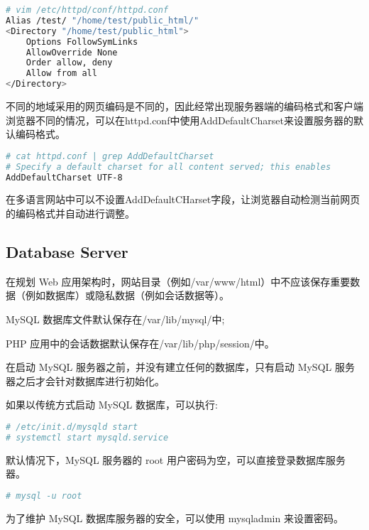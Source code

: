 \begin{lstlisting}[language=bash]
# vim /etc/httpd/conf/httpd.conf
Alias /test/ "/home/test/public_html/"
<Directory "/home/test/public_html">
	Options FollowSymLinks
	AllowOverride None
	Order allow, deny
	Allow from all
</Directory>
\end{lstlisting}


不同的地域采用的网页编码是不同的，因此经常出现服务器端的编码格式和客户端浏览器不同的情况，可以在httpd.conf中使用AddDefaultCharset来设置服务器的默认编码格式。

\begin{lstlisting}[language=bash]
# cat httpd.conf | grep AddDefaultCharset
# Specify a default charset for all content served; this enables
AddDefaultCharset UTF-8
\end{lstlisting}

在多语言网站中可以不设置AddDefaultCHarset字段，让浏览器自动检测当前网页的编码格式并自动进行调整。




\subsection{Database Server}

在规划 Web 应用架构时，网站目录（例如/var/www/html）中不应该保存重要数据（例如数据库）或隐私数据（例如会话数据等）。

\begin{compactitem}
\item MySQL 数据库文件默认保存在/var/lib/mysql/中;
\item PHP 应用中的会话数据默认保存在/var/lib/php/session/中。
\end{compactitem}

在启动 MySQL 服务器之前，并没有建立任何的数据库，只有启动 MySQL 服务器之后才会针对数据库进行初始化。

如果以传统方式启动 MySQL 数据库，可以执行:


\begin{lstlisting}[language=bash]
# /etc/init.d/mysqld start
# systemctl start mysqld.service
\end{lstlisting}


默认情况下，MySQL 服务器的 root 用户密码为空，可以直接登录数据库服务器。

\begin{lstlisting}[language=bash]
# mysql -u root
\end{lstlisting}

为了维护 MySQL 数据库服务器的安全，可以使用 mysqladmin 来设置密码。


